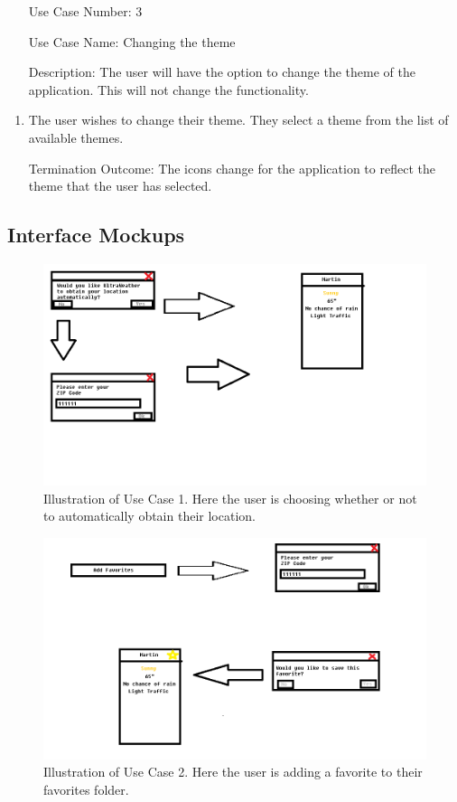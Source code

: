 \documentclass[10pt,conference,onecolumn,compsoc]{IEEEtran}
\begin{document}
\begin{itemize}
\item[Use Case Number:] 3
\item[Use Case Name:] Changing the theme
\item[Description:] The user will have the option to change the theme of the application. This will not change the functionality.
\end{itemize}

\begin{enumerate}
\item The user wishes to change their theme. They select a theme from the list of available themes.
\item[Termination Outcome:] The icons change for the application to reflect the theme that the user has selected. 
\end{enumerate}

\subsection{Interface Mockups}
\begin{figure}[ht!]
\includegraphics[scale=0.3]{use_case_1.png}
\caption{Illustration of Use Case 1. Here the user is choosing whether or not to automatically obtain their location.}
\label{use_case_1}
\end{figure}

\begin{figure}[ht!]
\includegraphics[scale=0.3]{use_case_2.png}
\caption{Illustration of Use Case 2. Here the user is adding a favorite to their favorites folder.}
\label{use_case_2}
\end{figure}
\end{document}
